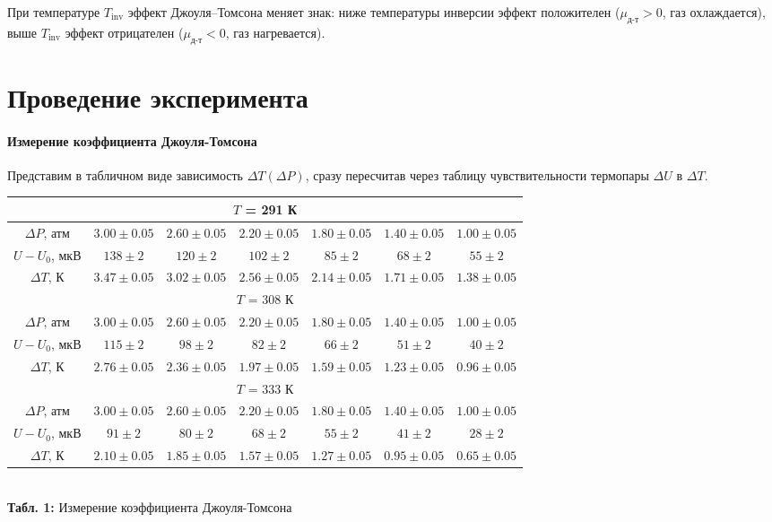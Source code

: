 \documentclass[12pt,a4paper]{scrartcl}
\begin{document}
	При температуре $T_{\mathrm{inv}}$ эффект Джоуля–Томсона меняет знак: ниже температуры инверсии эффект положителен ($\mu_{\text{д-т}} > 0$, газ охлаждается), выше $T_{\mathrm{inv}}$ эффект отрицателен ($\mu_{\text{д-т}} < 0$, газ нагревается).

	\section{Проведение эксперимента}
	\paragraph{Измерение коэффициента Джоуля-Томсона} \hfill
	
	Представим в табличном виде зависимость $\Delta T (\Delta P)$, сразу пересчитав через таблицу чувствительности термопары $\Delta U$ в $\Delta T$.

	\begin{center}
		\begin{tabular}{|c|c|c|c|c|c|c|}
			\hline
			\multicolumn{7}{|c|}{$T$ = 291 К}
			\\\hline
			$\Delta P$, атм & $3.00 \pm 0.05$ & $2.60 \pm 0.05$ & $2.20 \pm 0.05$ & $1.80 \pm 0.05$ & $1.40 \pm 0.05$ & $1.00 \pm 0.05$
			\\\hline
			$U - U_0$, мкВ & $138 \pm 2$ & $120 \pm 2$ & $102 \pm 2$ & $85 \pm 2$ & $68 \pm 2$ & $55 \pm 2$
			\\\hline
			$\Delta T$, К & $3.47 \pm 0.05$ & $3.02 \pm 0.05$ & $2.56 \pm 0.05$ & $2.14 \pm 0.05$ & $1.71 \pm 0.05$ & $1.38 \pm 0.05$
			\\\hline
			\multicolumn{7}{|c|}{$T$ = 308 К}
			\\\hline
			$\Delta P$, атм & $3.00 \pm 0.05$ & $2.60 \pm 0.05$ & $2.20 \pm 0.05$ & $1.80 \pm 0.05$ & $1.40 \pm 0.05$ & $1.00 \pm 0.05$
			\\\hline
			$U - U_0$, мкВ & $115 \pm 2$ & $98 \pm 2$ & $82 \pm 2$ & $66 \pm 2$ & $51 \pm 2$ & $40 \pm 2$
			\\\hline
			$\Delta T$, К & $2.76 \pm 0.05$ & $2.36 \pm 0.05$ & $1.97 \pm 0.05$ & $1.59 \pm 0.05$ & $1.23 \pm 0.05$ & $0.96 \pm 0.05$
			\\\hline
			\multicolumn{7}{|c|}{$T$ = 333 К}
			\\\hline
			$\Delta P$, атм & $3.00 \pm 0.05$ & $2.60 \pm 0.05$ & $2.20 \pm 0.05$ & $1.80 \pm 0.05$ & $1.40 \pm 0.05$ & $1.00 \pm 0.05$
			\\\hline
			$U - U_0$, мкВ & $91 \pm 2$ & $80 \pm 2$ & $68 \pm 2$ & $55 \pm 2$ & $41 \pm 2$ & $28 \pm 2$
			\\\hline
			$\Delta T$, К & $2.10 \pm 0.05$ & $1.85 \pm 0.05$ & $1.57 \pm 0.05$ & $1.27 \pm 0.05$ & $0.95 \pm 0.05$ & $0.65 \pm 0.05$
			\\\hline
		\end{tabular}
		\\\textbf{Табл. 1:} Измерение коэффициента Джоуля-Томсона
	\end{center}
\end{document}
